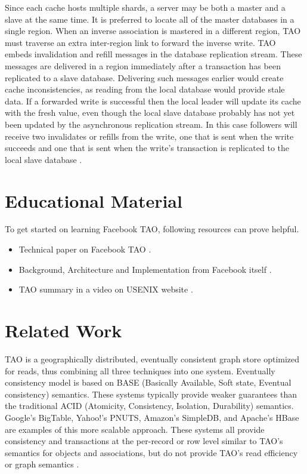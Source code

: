 \documentclass[9pt,twocolumn,twoside]{../../styles/osajnl}
\begin{document}
Since each cache hosts multiple shards, a server may be both a master and a slave at the same time. It is preferred to locate all of the master databases in a single region. When an inverse association is mastered in a different region, TAO must traverse an extra inter-region link to forward the inverse write. TAO embeds invalidation and refill messages in the database replication stream. These messages are delivered in a region immediately after a transaction has been replicated to a slave database. Delivering such messages earlier would create cache inconsistencies, as reading from the local database would provide stale data. If a forwarded write is successful then the local leader will update its cache with the fresh value, even though the local slave database probably has not yet been updated by the asynchronous replication stream. In this case followers will receive two invalidates or refills from the write, one that is sent when the write succeeds and one that is sent when the write’s transaction is replicated to the local slave database \cite{www-tao4}.

\section{Educational Material}

To get started on learning Facebook TAO, following resources can prove helpful.

\begin{itemize}
\item Technical paper on Facebook TAO \cite{book-tao1}.

\item Background, Architecture and Implementation from Facebook itself \cite{www-tao2}.

\item TAO summary in a video on USENIX website \cite{www-tao3}.

\end{itemize}

\section{Related Work}

TAO is a geographically distributed, eventually consistent graph store optimized for reads, thus combining all three techniques into one system. Eventually consistency model is based on BASE (Basically Available, Soft state, Eventual consistency) semantics. These systems typically provide weaker guarantees than the traditional ACID (Atomicity, Consistency, Isolation, Durability) semantics. Google’s BigTable, Yahoo!’s PNUTS, Amazon’s SimpleDB, and Apache’s HBase are examples of this more scalable approach. These systems all provide consistency and transactions at the per-record or row level similar to TAO’s semantics for objects and associations, but do not provide TAO’s read efficiency or graph semantics \cite{book-tao1}. 
\end{document}

